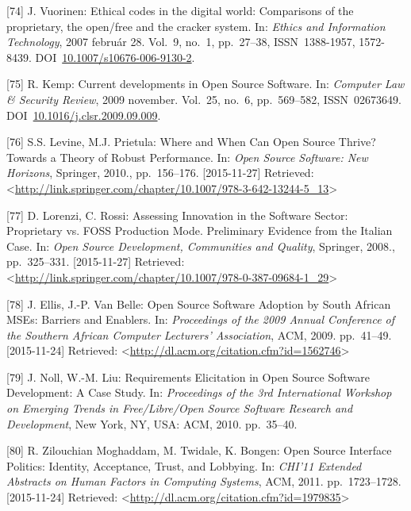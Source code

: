 \documentclass[12pt,magyar,a4paper,oneside]{scrreprt}
\begin{document}
\leavevmode\hypertarget{ref-vuorinen_ethical_2007}{}%
{[}74{]} J. Vuorinen: Ethical codes in the digital world: Comparisons of
the proprietary, the open/free and the cracker system. In: \emph{Ethics
and Information Technology}, 2007 február 28. Vol.~9, no.~1, pp.~27--38,
ISSN~1388-1957, 1572-8439.
DOI~\href{https://doi.org/10.1007/s10676-006-9130-2}{10.1007/s10676-006-9130-2}.

\leavevmode\hypertarget{ref-kemp_current_2009}{}%
{[}75{]} R. Kemp: Current developments in Open Source Software. In:
\emph{Computer Law \& Security Review}, 2009 november. Vol.~25, no.~6,
pp.~569--582, ISSN~02673649.
DOI~\href{https://doi.org/10.1016/j.clsr.2009.09.009}{10.1016/j.clsr.2009.09.009}.

\leavevmode\hypertarget{ref-levine_where_2010}{}%
{[}76{]} S.S. Levine, M.J. Prietula: Where and When Can Open Source
Thrive? Towards a Theory of Robust Performance. In: \emph{Open Source
Software: New Horizons}, Springer, 2010., pp.~156--176. {[}2015-11-27{]}
Retrieved:
\textless{}\url{http://link.springer.com/chapter/10.1007/978-3-642-13244-5_13}\textgreater{}

\leavevmode\hypertarget{ref-lorenzi_assessing_2008}{}%
{[}77{]} D. Lorenzi, C. Rossi: Assessing Innovation in the Software
Sector: Proprietary vs. FOSS Production Mode. Preliminary Evidence from
the Italian Case. In: \emph{Open Source Development, Communities and
Quality}, Springer, 2008., pp.~325--331. {[}2015-11-27{]} Retrieved:
\textless{}\url{http://link.springer.com/chapter/10.1007/978-0-387-09684-1_29}\textgreater{}

\leavevmode\hypertarget{ref-ellis_open_2009}{}%
{[}78{]} J. Ellis, J.-P. Van Belle: Open Source Software Adoption by
South African MSEs: Barriers and Enablers. In: \emph{Proceedings of the
2009 Annual Conference of the Southern African Computer Lecturers'
Association}, ACM, 2009. pp.~41--49. {[}2015-11-24{]} Retrieved:
\textless{}\url{http://dl.acm.org/citation.cfm?id=1562746}\textgreater{}

\leavevmode\hypertarget{ref-noll_requirements_2010}{}%
{[}79{]} J. Noll, W.-M. Liu: Requirements Elicitation in Open Source
Software Development: A Case Study. In: \emph{Proceedings of the 3rd
International Workshop on Emerging Trends in Free/Libre/Open Source
Software Research and Development}, New York, NY, USA: ACM, 2010.
pp.~35--40.

\leavevmode\hypertarget{ref-zilouchian_moghaddam_open_2011}{}%
{[}80{]} R. Zilouchian Moghaddam, M. Twidale, K. Bongen: Open Source
Interface Politics: Identity, Acceptance, Trust, and Lobbying. In:
\emph{CHI'11 Extended Abstracts on Human Factors in Computing Systems},
ACM, 2011. pp.~1723--1728. {[}2015-11-24{]} Retrieved:
\textless{}\url{http://dl.acm.org/citation.cfm?id=1979835}\textgreater{}
\end{document}
